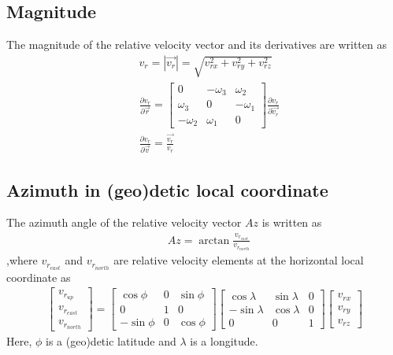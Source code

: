 \documentclass[11pt]{article}
\begin{document}
\subsection{Magnitude}
The magnitude of the relative velocity vector and its derivatives are written as
\begin{equation}
	\label{eq:rel_velocity_magnitude}
	\begin{aligned}
		&v_r = \left|\vec{v_r}\right| = \sqrt{v_{rx}^{2}+v_{ry}^{2}+v_{rz}^{2}}\\
		&\frac{\partial{v_r}}{\partial{\vec{r}}} =
		\begin{bmatrix}
		0 & -\omega_3 & \omega_2 \\
		\omega_3 & 0 & -\omega_1 \\
		-\omega_2 & \omega_1 & 0
		\end{bmatrix}
		\frac{\partial{v_r}}{\partial{\vec{v_r}}}\\
		&\frac{\partial{v_r}}{\partial{\vec{v}}} = \frac{\vec{v_{r}}}{v_r}
	\end{aligned}
\end{equation}


\subsection{Azimuth in (geo)detic local coordinate}\label{Detic Azimuth}
The azimuth angle of the relative velocity vector $Az$ is written as
\begin{equation}
	\label{eq:rel_velocity_Az}
	\begin{aligned}
		&Az = \arctan{\frac{v_{r_{east}}}{v_{r_{north}}}}
	\end{aligned}
\end{equation}
,where $v_{r_{east}}$ and $v_{r_{north}}$ are relative velocity elements at the horizontal local coordinate as
\begin{equation}
	\label{eq:rel_velocity_local}
	\begin{aligned}
		\begin{bmatrix}
		v_{r_{up}}\\
		v_{r_{east}}\\
		v_{r_{north}}
		\end{bmatrix} =
		\begin{bmatrix}
		\cos{\phi} & 0 & \sin{\phi}\\
		0 & 1 & 0\\
		-\sin{\phi} & 0 & \cos{\phi}
		\end{bmatrix}
		\begin{bmatrix}
		\cos{\lambda} & \sin{\lambda} & 0\\
		-\sin{\lambda}& \cos{\lambda} & 0\\
		0 & 0 & 1
		\end{bmatrix}
		\begin{bmatrix}
		v_{rx}\\
		v_{ry}\\
		v_{rz}
		\end{bmatrix}
	\end{aligned}
\end{equation}
Here, $\phi$ is a (geo)detic latitude and $\lambda$ is a longitude.
\end{document}
